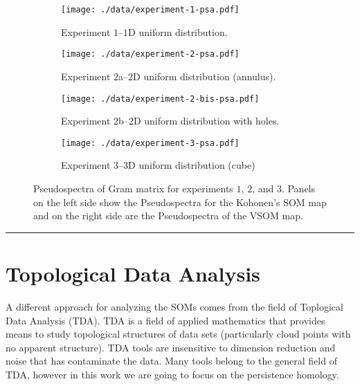 \documentclass[10pt]{article}
\theoremstyle{definition}
\begin{document}
\begin{figure}[!htpb]
     \begin{subfigure}{0.5\textwidth}
         \centering
         \texttt{[image: ./data/experiment-1-psa.pdf]}
         \caption{Experiment $1$--$1$D uniform distribution.}%
         \label{Fig:psa_exp1}
     \end{subfigure}
     \begin{subfigure}{0.5\textwidth}
         \centering
         \texttt{[image: ./data/experiment-2-psa.pdf]}
         \caption{Experiment $2$a--$2$D uniform distribution (annulus).}%
         \label{Fig:psa_exp2a}
     \end{subfigure}
     \newline 
     \begin{subfigure}{0.5\textwidth}
         \centering
         \texttt{[image: ./data/experiment-2-bis-psa.pdf]}
         \caption{Experiment $2$b--$2$D uniform distribution with holes.}%
         \label{Fig:psa_exp2b}
     \end{subfigure}
     \begin{subfigure}{0.5\textwidth}
         \centering
         \texttt{[image: ./data/experiment-3-psa.pdf]}
         \caption{Experiment $3$--$3$D uniform distribution (cube)}%
         \label{Fig:psa_exp3}
     \end{subfigure}
    \caption{Pseudospectra of Gram matrix for experiments $1$, $2$, and $3$.
    Panels on the left side show the Pseudospectra for the Kohonen's SOM map
    and on the right side are the Pseudospectra of the VSOM map.}%
    \label{Fig:psas}
\end{figure}

\noindent \rule{\textwidth}{1pt}

\section*{Topological Data Analysis}

A different approach for analyzing the SOMs comes from the field of Toplogical
Data Analysis (TDA). TDA is a field of applied mathematics that provides 
means to study topological structures of data sets (particularly cloud points
with no apparent structure). TDA tools are insensitive to dimension reduction
and noise that has contaminate the data. 
Many tools belong to the general field of TDA, however in this work we are
going to focus on the persistence homology. 
\end{document}
